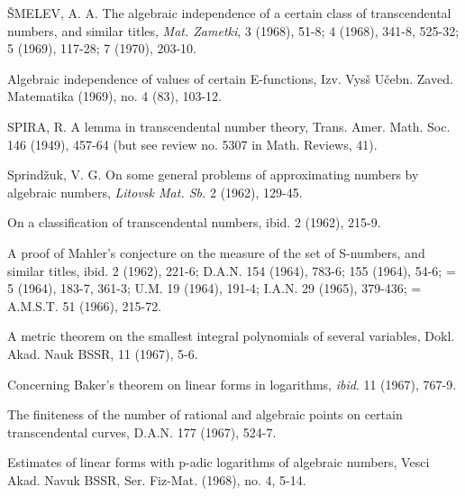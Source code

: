 \begin{hanglist}
    \item ŠMELEV, A. A. The algebraic independence of a certain class of transcendental numbers, and similar titles, \textit{Mat. Zametki}, 3 (1968), 51-8; 4 (1968), 341-8, 525-32; 5 (1969), 117-28; 7 (1970), 203-10.
    \item \hspace{1.5em} Algebraic independence of values of certain E-functions, Izv. Vysš Učebn. Zaved. Matematika (1969), no. 4 (83), 103-12.
    \item SPIRA, R. A lemma in transcendental number theory, Trans. Amer. Math. Soc. 146 (1949), 457-64 (but see review no. 5307 in Math. Reviews, 41).
    \item Sprindžuk, V. G. On some general problems of approximating numbers by algebraic numbers, \textit{Litovsk Mat. Sb.} 2 (1962), 129-45.
    \item \hspace{1.5em} On a classification of transcendental numbers, ibid. 2 (1962), 215-9.
    \item \hspace{1.5em} A proof of Mahler's conjecture on the measure of the set of S-numbers, and similar titles, ibid. 2 (1962), 221-6; D.A.N. 154 (1964), 783-6; 155 (1964), 54-6; = 5 (1964), 183-7, 361-3; U.M. 19 (1964), 191-4; I.A.N. 29 (1965), 379-436; = A.M.S.T. 51 (1966), 215-72.
    \item \hspace{1.5em} A metric theorem on the smallest integral polynomials of several variables, Dokl. Akad. Nauk BSSR, 11 (1967), 5-6.
    \item \hspace{1.5em} Concerning Baker's theorem on linear forms in logarithms, \textit{ibid}. 11 (1967), 767-9.
    \item \hspace{1.5em} The finiteness of the number of rational and algebraic points on certain transcendental curves, D.A.N. 177 (1967), 524-7.
    \item \hspace{1.5em} Estimates of linear forms with p-adic logarithms of algebraic numbers, Vesci Akad. Navuk BSSR, Ser. Fiz-Mat. (1968), no. 4, 5-14.

\end{hanglist}
